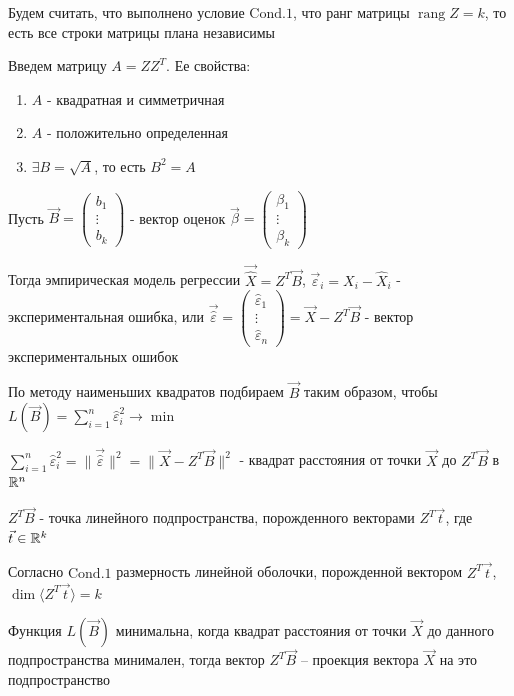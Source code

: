 \documentclass[12pt]{article}
\begin{document}
Будем считать, что выполнено условие $\mathrm{Cond. 1}$, что ранг матрицы $\operatorname{rang} Z = k$, то есть все строки матрицы плана независимы

Введем матрицу $A = Z Z^T$. Ее свойства:

\begin{enumerate}
    \item $A$ - квадратная и симметричная
    \item $A$ - положительно определенная
    \item $\exists B = \sqrt{A}$, то есть $B^2 = A$
\end{enumerate}

Пусть $\vec B = \begin{pmatrix}b_1 \\ \vdots \\ b_k\end{pmatrix}$ - вектор оценок $\vec \beta = \begin{pmatrix}\beta_1 \\ \vdots \\ \beta_k\end{pmatrix}$

Тогда эмпирическая модель регрессии $\vec{\hat X} = Z^T \vec B$, 
$\vec \varepsilon_i = X_i - \hat X_i$ - экспериментальная ошибка, или $\vec {\hat \varepsilon} = \begin{pmatrix}\hat \varepsilon_1 \\ \vdots \\ \hat \varepsilon_n\end{pmatrix} = \vec X - Z^T \vec B$ - вектор экспериментальных ошибок

По методу наименьших квадратов подбираем $\vec B$ таким образом, чтобы $L(\vec B) = \sum_{i = 1}^n \hat \varepsilon_i^2 \longrightarrow \min$

$\sum_{i = 1}^n \hat \varepsilon_i^2 = \|\vec{\hat \varepsilon}\|^2 = \| \vec X - Z^T \vec B\|^2$ - квадрат расстояния от точки $\vec X$ до $Z^T \vec B$ в $\mathbb{R}^n$

$Z^T \vec B$ - точка линейного подпространства, порожденного векторами $Z^T \vec t$, где $\vec t \in \mathbb{R}^k$

\Nota Согласно $\mathrm{Cond. 1}$ размерность линейной оболочки, порожденной вектором $Z^T \vec t$,  $\dim \langle Z^T \vec t \rangle = k$

Функция $L(\vec B)$ минимальна, когда квадрат расстояния от точки $\vec X$ до данного подпространства минимален, тогда вектор $Z^T \vec B$ -- проекция вектора $\vec X$ на это подпространство
\end{document}
